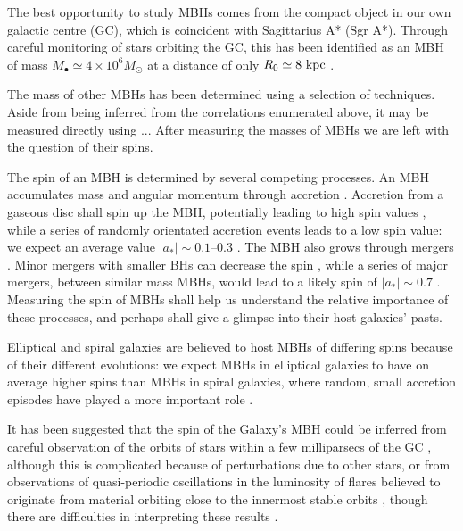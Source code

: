 The best opportunity to study MBHs comes from the compact object in our own galactic centre (GC), which is coincident with Sagittarius A* (Sgr A*). Through careful monitoring of stars orbiting the GC, this has been identified as an MBH of mass $M_\bullet \simeq 4 \times 10^6 M_\odot$ at a distance of only $R_0 \simeq 8~\mathrm{kpc}$ \citep{Gillessen2009, Meyer2012}.

The mass of other MBHs has been determined using a selection of techniques. Aside from being inferred from the correlations enumerated above, it may be measured directly using ... After measuring the masses of MBHs we are left with the question of their spins.

The spin of an MBH is determined by several competing processes. An MBH accumulates mass and angular momentum through accretion \citep{Volonteri2010}. Accretion from a gaseous disc shall spin up the MBH, potentially leading to high spin values \citep{Volonteri2005}, while a series of randomly orientated accretion events leads to a low spin value: we expect an average value $|a_\ast| \sim 0.1$--$0.3$ \citep{King2006, King2008}. The MBH also grows through mergers \citep{Yu2002, Malbon2007}. Minor mergers with smaller BHs can decrease the spin \citep{Hughes2003, Gammie2004}, while a series of major mergers, between similar mass MBHs, would lead to a likely spin of $|a_\ast| \sim 0.7$ \citep{Berti2008, Berti2007, Gonzalez2007}. Measuring the spin of MBHs shall help us understand the relative importance of these processes, and perhaps shall give a glimpse into their host galaxies' pasts.

Elliptical and spiral galaxies are believed to host MBHs of differing spins because of their different evolutions: we expect MBHs in elliptical galaxies to have on average higher spins than MBHs in spiral galaxies, where random, small accretion episodes have played a more important role \citep{Volonteri2007, Sikora2007}.

It has been suggested that the spin of the Galaxy's MBH could be inferred from careful observation of the orbits of stars within a few milliparsecs of the GC \citep{Merritt2010}, although this is complicated because of perturbations due to other stars, or from observations of quasi-periodic oscillations in the luminosity of flares believed to originate from material orbiting close to the innermost stable orbits \citep{Genzel2003a, Belanger2006, Trippe2007, Hamaus2009, Kato2010}, though there are difficulties in interpreting these results \citep{Psaltis2008a}.

